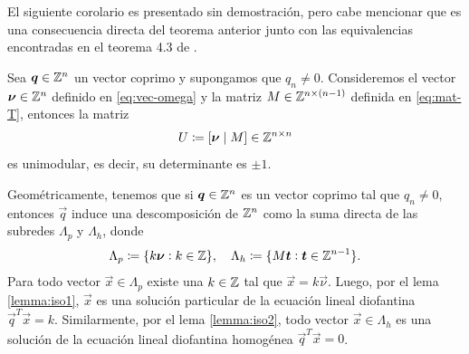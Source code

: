 El siguiente corolario es presentado sin demostración, pero cabe mencionar que es una consecuencia
directa del teorema anterior junto con las equivalencias encontradas en el teorema 4.3 de \cite{alex}.
\begin{corollary}
	\label{cor:unimodular}
	Sea $\boldsymbol{q} \in \mathbb{Z}^n$ un vector coprimo y supongamos que $q_n \neq 0$.
	Consideremos el vector $\boldsymbol{\nu} \in \mathbb{Z}^n$ definido en
	\eqref{eq:vec-omega} y la matriz $M \in \mathbb{Z}^{n \times (n - 1)}$ definida en
	\eqref{eq:mat-T}, entonces la matriz
	\begin{equation}
		\label{u-matrix}
		U \coloneq [ \boldsymbol{\nu} \mid M] \in \mathbb{Z}^{n \times n}
	\end{equation}
	es unimodular, es decir, su determinante es $\pm 1$.
\end{corollary}


Geométricamente, tenemos que si $\boldsymbol{q} \in \mathbb{Z}^n$ es un vector coprimo tal que $q_n \neq 0$,
entonces $\vec{q}$ induce una descomposición de $\mathbb{Z}^n$ como la suma directa de las subredes
$\Lambda_p$ y $\Lambda_h$, donde
\begin{equation}
	\label{eq:dec}
	\Lambda_p \coloneq \lbrace k\boldsymbol{\nu} \vcentcolon k \in \mathbb{Z} \rbrace, \quad
	\Lambda_h \coloneq \lbrace M\boldsymbol{t} \vcentcolon \boldsymbol{t} \in \mathbb{Z}^{n-1} \rbrace.
\end{equation}
Para todo vector $\vec{x} \in \Lambda_p$ existe una $k \in \mathbb{Z}$ tal que $\vec{x} =
k\vec{\nu}$. Luego, por el lema \ref{lemma:iso1}, $\vec{x}$ es una solución particular de la
ecuación lineal diofantina $\vec{q}^T\vec{x} = k$. Similarmente, por el lema \ref{lemma:iso2}, todo
vector $\vec{x} \in \Lambda_h$ es una solución de la ecuación lineal diofantina homogénea
$\vec{q}^T\vec{x} = 0$.

